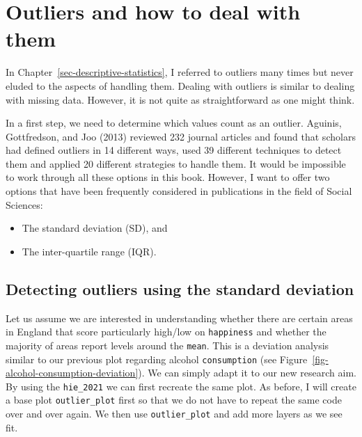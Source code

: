 \documentclass[
  letterpaper,
]{krantz}
\begin{document}
\section{Outliers and how to deal with
them}\label{sec-dealing-with-outliers}

In Chapter~\ref{sec-descriptive-statistics}, I referred to outliers many
times but never eluded to the aspects of handling them. Dealing with
outliers is similar to dealing with missing data. However, it is not
quite as straightforward as one might think.

In a first step, we need to determine which values count as an outlier.
Aguinis, Gottfredson, and Joo (2013) reviewed 232 journal articles and
found that scholars had defined outliers in 14 different ways, used 39
different techniques to detect them and applied 20 different strategies
to handle them. It would be impossible to work through all these options
in this book. However, I want to offer two options that have been
frequently considered in publications in the field of Social Sciences:

\begin{itemize}
\item
  The standard deviation (SD), and
\item
  The inter-quartile range (IQR).
\end{itemize}

\subsection{Detecting outliers using the standard
deviation}\label{sec-ouliers-standard_deviation}

Let us assume we are interested in understanding whether there are
certain areas in England that score particularly high/low on
\texttt{happiness} and whether the majority of areas report levels
around the \texttt{mean}. This is a deviation analysis similar to our
previous plot regarding alcohol \texttt{consumption} (see
Figure~\ref{fig-alcohol-consumption-deviation}). We can simply adapt it
to our new research aim. By using the \texttt{hie\_2021} we can first
recreate the same plot. As before, I will create a base plot
\texttt{outlier\_plot} first so that we do not have to repeat the same
code over and over again. We then use \texttt{outlier\_plot} and add
more layers as we see fit.
\end{document}
